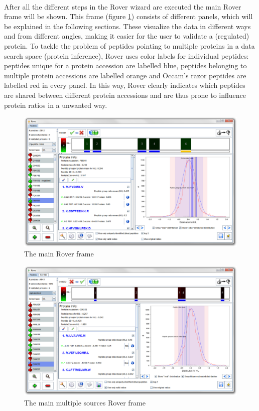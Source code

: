 \documentclass[11pt,a4paper,oneside,notitlepage]{book}
\begin{document}
\paragraph{}After all the different steps in the Rover wizard are executed the main Rover frame will be shown. This frame (figure \ref{roverGui}) consists of different panels, which will be explained in the following sections. These visualize the data in different ways and from different angles, making it easier for the user to validate a (regulated) protein. To tackle the problem of peptides pointing to multiple proteins in a data search space (protein inference), Rover uses color labels for individual peptides: peptides unique for a protein accession are labelled blue, peptides belonging to multiple protein accessions are labelled orange and Occam's razor peptides are labelled red in every panel. In this way, Rover clearly indicates which peptides are shared between different protein accessions and are thus prone to influence protein ratios in a unwanted way. 
\begin{figure}[H]
\begin{center}
\includegraphics[scale=0.4]{Rover_S.png}
\caption{The main Rover frame}
\label{roverGui}
\end{center}
\end{figure}

\begin{figure}[H]
\begin{center}
\includegraphics[scale=0.4]{Rover_M.png}
\caption{The main multiple sources Rover frame}
\label{roverGuiMulti}
\end{center}
\end{figure}
\end{document}

